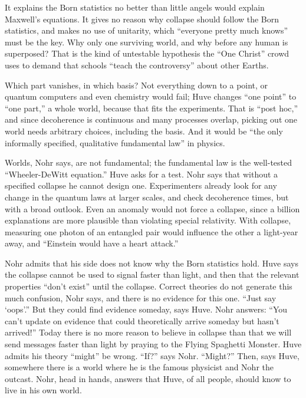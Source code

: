 It explains the Born statistics no better than little angels would explain Maxwell's equations. It gives no reason why collapse should follow the Born statistics, and makes no use of unitarity, which ``everyone pretty much knows'' must be the key. Why only one surviving world, and why before any human is superposed? That is the kind of untestable hypothesis the ``One Christ'' crowd uses to demand that schools ``teach the controversy'' about other Earths.

Which part vanishes, in which basis? Not everything down to a point, or quantum computers and even chemistry would fail; Huve changes ``one point'' to ``one part,'' a whole world, because that fits the experiments. That is ``post hoc,'' and since decoherence is continuous and many processes overlap, picking out one world needs arbitrary choices, including the basis. And it would be ``the only informally specified, qualitative fundamental law'' in physics. 

Worlds, Nohr says, are not fundamental; the fundamental law is the well-tested ``Wheeler-DeWitt equation.''  Huve asks for a test. Nohr says that without a specified collapse he cannot design one. Experimenters already look for any change in the quantum laws at larger scales, and check decoherence times, but with a broad outlook. Even an anomaly would not force a collapse, since a billion explanations are more plausible than violating special relativity. With collapse, measuring one photon of an entangled pair would influence the other a light-year away, and ``Einstein would have a heart attack.'' 

Nohr admits that his side does not know why the Born statistics hold.  Huve says the collapse cannot be used to signal faster than light, and then that the relevant properties ``don't exist'' until the collapse.  Correct theories do not generate this much confusion, Nohr says, and there is no evidence for this one. ``Just say `oops'.'' But they could find evidence someday, says Huve. Nohr answers: ``You can't update on evidence that could theoretically arrive someday but hasn't arrived!'' Today there is no more reason to believe in collapse than that we will send messages faster than light by praying to the Flying Spaghetti Monster. Huve admits his theory ``might'' be wrong. ``If?'' says Nohr. ``Might?'' Then, says Huve, somewhere there is a world where he is the famous physicist and Nohr the outcast. Nohr, head in hands, answers that Huve, of all people, should know to live in his own world.

